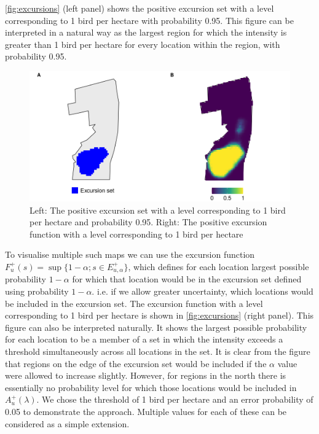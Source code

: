 \documentclass{stylefile16/statsoc}
\begin{document}
\autoref{fig:excursions} (left panel) shows the positive excursion set with a level corresponding to 1 bird per hectare with probability 0.95.  This figure can be interpreted in a natural way as the largest region for which the intensity is greater than 1 bird per hectare for every location within the region, with probability 0.95.
\begin{figure}[!htb]
	\includegraphics[scale=0.5]{figures/excursions.png}
	\caption{Left:  The positive excursion set with a level corresponding to 1 bird per hectare and probability 0.95.  Right: The positive excursion function with a level corresponding to 1 bird per hectare}
	\label{fig:excursions}
\end{figure}
To visualise multiple such maps we can use the excursion function $F_u^{+}(s) = \sup \{1 - \alpha ; s \in E_{u,\alpha}^+ \}$, which defines for each location largest possible probability $1 -\alpha$ for which that location would be in the excursion set defined using probability $1 - \alpha$.  i.e.  if we allow greater uncertainty, which locations would be included in the excursion set.  The excursion function with a level corresponding to 1 bird per hectare is shown in \autoref{fig:excursions} (right panel).  This figure can also be interpreted naturally.  It shows the largest possible probability for each location to be a member of a set in which the intensity exceeds a threshold simultaneously across all locations in the set. It is clear from the figure that regions on the edge of the excursion set would be included if the $\alpha$ value were allowed to increase slightly.  However, for regions in the north there is essentially no probability level for which those locations would be included in $A_u^{+}(\lambda)$.
We chose the threshold of 1 bird per hectare and an error probability of 0.05 to demonstrate the approach.  Multiple values for each of these can be considered as a simple extension.
\end{document}
